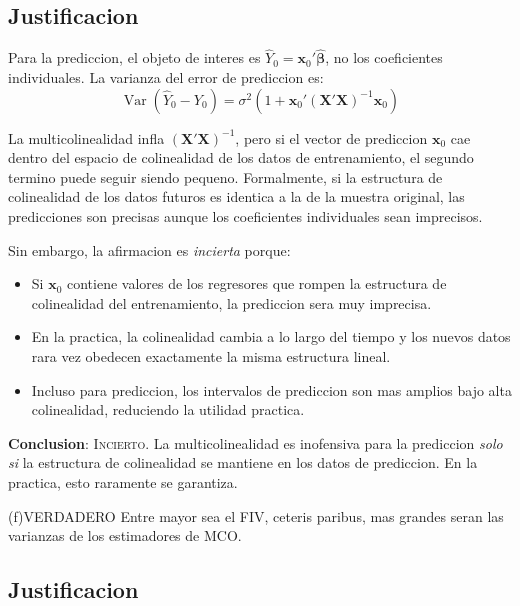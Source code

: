\documentclass[12pt, letterpaper]{article}
\theoremstyle{remark}
\newcommand{\Var}{\operatorname{Var}}
\begin{document}
\subsection*{Justificacion}

Para la prediccion, el objeto de interes es $\hat Y_0 = \mathbf{x}_0'\hat{\boldsymbol\beta}$,
no los coeficientes individuales. La varianza del error de prediccion es:
\begin{equation}
  \Var(\hat Y_0 - Y_0) = \sigma^2\left(1 + \mathbf{x}_0'(\mathbf{X'X})^{-1}\mathbf{x}_0\right)
  \label{eq:var_pred}
\end{equation}

La multicolinealidad infla $(\mathbf{X'X})^{-1}$, pero si el vector de
prediccion $\mathbf{x}_0$ cae dentro del espacio de colinealidad de los
datos de entrenamiento, el segundo termino puede seguir siendo pequeno.
Formalmente, si la estructura de colinealidad de los datos futuros es
identica a la de la muestra original, las predicciones son precisas aunque
los coeficientes individuales sean imprecisos.

Sin embargo, la afirmacion es \emph{incierta} porque:
\begin{itemize}[leftmargin=1.6em, itemsep=3pt]
  \item Si $\mathbf{x}_0$ contiene valores de los regresores que rompen la
    estructura de colinealidad del entrenamiento, la prediccion sera muy
    imprecisa.
  \item En la practica, la colinealidad cambia a lo largo del tiempo y los
    nuevos datos rara vez obedecen exactamente la misma estructura lineal.
  \item Incluso para prediccion, los intervalos de prediccion son mas
    amplios bajo alta colinealidad, reduciendo la utilidad practica.
\end{itemize}

\textbf{Conclusion}: \textsc{Incierto}. La multicolinealidad es inofensiva
para la prediccion \emph{solo si} la estructura de colinealidad se mantiene
en los datos de prediccion. En la practica, esto raramente se garantiza.

\bigskip

\begin{verdict}{(f)}{VERDADERO}
  Entre mayor sea el FIV, ceteris paribus, mas grandes seran las varianzas de
  los estimadores de MCO.
\end{verdict}

\subsection*{Justificacion}
\end{document}
